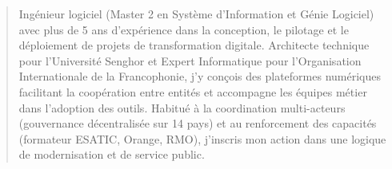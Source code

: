 \documentclass[10pt,a4paper,ragged2e,withhyper]{altacv}
\begin{document}


    \makecvheader

    \begin{quote}
    \normalsize Ingénieur logiciel (Master 2 en Système d'Information et Génie Logiciel) avec plus de 5 ans d'expérience dans la conception, le pilotage et le déploiement de projets de transformation digitale. Architecte technique pour l'Université Senghor et Expert Informatique pour l'Organisation Internationale de la Francophonie, j'y conçois des plateformes numériques facilitant la coopération entre entités et accompagne les équipes métier dans l'adoption des outils. Habitué à la coordination multi-acteurs (gouvernance décentralisée sur 14 pays) et au renforcement des capacités (formateur ESATIC, Orange, RMO), j'inscris mon action dans une logique de modernisation et de service public.
    \end{quote}
    \vspace{-0.5em}

\end{document}
